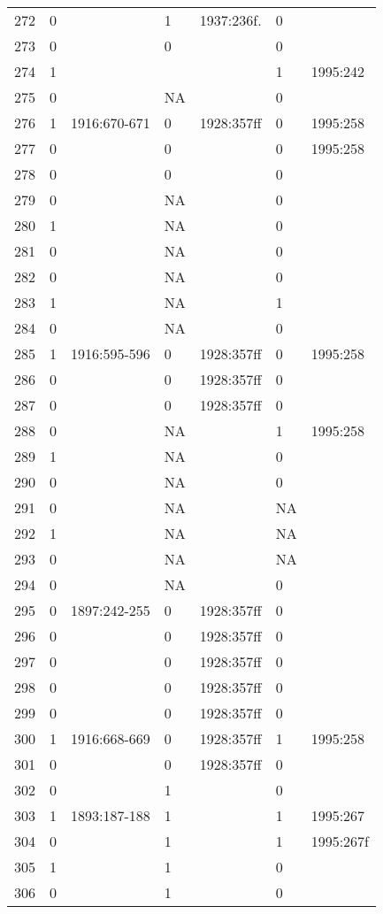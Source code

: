 {\begin{longtable}{p{.04\linewidth}p{.1\linewidth}p{.16\linewidth}p{.08\linewidth}p{.16\linewidth}p{.08\linewidth}p{.16\linewidth}}
272 & 0 &  & 1 & 1937:236f. & 0 & \\
273 & 0 &  & 0 &  & 0 & \\
274 & 1 &  &  &  & 1 & 1995:242\\
275 & 0 &  & NA &  & 0 & \\
276 & 1 & 1916:670-671 & 0 & 1928:357ff & 0 & 1995:258\\
277 & 0 &  & 0 &  & 0 & 1995:258\\
278 & 0 &  & 0 &  & 0 & \\
279 & 0 &  & NA &  & 0 & \\
280 & 1 &  & NA &  & 0 & \\
281 & 0 &  & NA &  & 0 & \\
282 & 0 &  & NA &  & 0 & \\
283 & 1 &  & NA &  & 1 & \\
284 & 0 &  & NA &  & 0 & \\
285 & 1 & 1916:595-596 & 0 & 1928:357ff & 0 & 1995:258\\
286 & 0 &  & 0 & 1928:357ff & 0 & \\
287 & 0 &  & 0 & 1928:357ff & 0 & \\
288 & 0 &  & NA &  & 1 & 1995:258\\
289 & 1 &  & NA &  & 0 & \\
290 & 0 &  & NA &  & 0 & \\
291 & 0 &  & NA &  & NA & \\
292 & 1 &  & NA &  & NA & \\
293 & 0 &  & NA &  & NA & \\
294 & 0 &  & NA &  & 0 & \\
295 & 0 & 1897:242-255 & 0 & 1928:357ff & 0 & \\
296 & 0 &  & 0 & 1928:357ff & 0 & \\
297 & 0 &  & 0 & 1928:357ff & 0 & \\
298 & 0 &  & 0 & 1928:357ff & 0 & \\
299 & 0 &  & 0 & 1928:357ff & 0 & \\
300 & 1 & 1916:668-669 & 0 & 1928:357ff & 1 & 1995:258\\
301 & 0 &  & 0 & 1928:357ff & 0 & \\
302 & 0 &  & 1 &  & 0 & \\
303 & 1 & 1893:187-188 & 1 &  & 1 & 1995:267\\
304 & 0 &  & 1 &  & 1 & 1995:267f\\
305 & 1 &  & 1 &  & 0 & \\
306 & 0 &  & 1 &  & 0 & \\

\end{longtable}}
